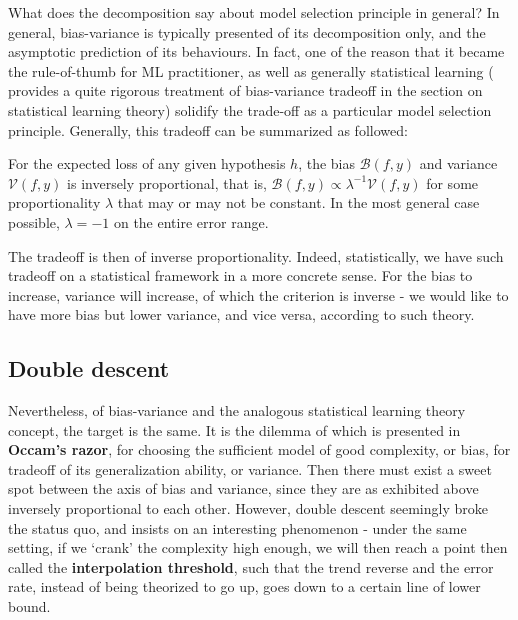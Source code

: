 \documentclass[10pt]{article} %
\begin{document}
What does the decomposition say about model selection principle in general? In general, bias-variance is typically presented of its decomposition only, and the asymptotic prediction of its behaviours. In fact, one of the reason that it became the rule-of-thumb for ML practitioner, as well as generally statistical learning (\cite{lafon_understanding_2024} provides a quite rigorous treatment of bias-variance tradeoff in the section on statistical learning theory) solidify the trade-off as a particular model selection principle. Generally, this tradeoff can be summarized as followed: 
\begin{theorem}
    For the expected loss of any given hypothesis $h$, the bias $\mathcal{B}(f,y)$ and variance $\mathcal{V}(f,y)$ is inversely proportional, that is, $\mathcal{B}(f,y)\propto \lambda^{-1} \mathcal{V}(f,y)$ for some proportionality $\lambda$ that may or may not be constant. In the most general case possible, $\lambda = -1$ on the entire error range. 
\end{theorem}

The tradeoff is then of inverse proportionality. Indeed, statistically, we have such tradeoff on a statistical framework in a more concrete sense. For the bias to increase, variance will increase, of which the criterion is inverse - we would like to have more bias but lower variance, and vice versa, according to such theory. 

\subsection{Double descent}

Nevertheless, of bias-variance and the analogous statistical learning theory concept, the target is the same. It is the dilemma of which is presented in \textbf{Occam's razor}, for choosing the sufficient model of good complexity, or bias, for tradeoff of its generalization ability, or variance. Then there must exist a sweet spot between the axis of bias and variance, since they are as exhibited above inversely proportional to each other. However, double descent seemingly broke the status quo, and insists on an interesting phenomenon - under the same setting, if we `crank' the complexity high enough, we will then reach a point then called the \textbf{interpolation threshold}, such that the trend reverse and the error rate, instead of being theorized to go up, goes down to a certain line of lower bound. 
\end{document}
